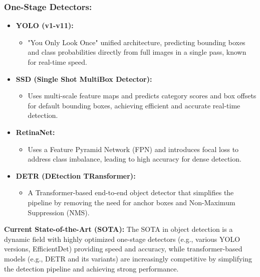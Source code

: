 \documentclass{article}
\begin{document}
\subsubsection{One-Stage Detectors:}
\begin{itemize}[leftmargin=1.5em]
  \item \textbf{YOLO (v1-v11):} 
    \begin{itemize}
      \item "You Only Look Once" unified architecture, predicting bounding boxes and class probabilities directly from full images in a single pass, known for real-time speed.
    \end{itemize}
  \item \textbf{SSD (Single Shot MultiBox Detector):}
    \begin{itemize}
      \item Uses multi-scale feature maps and predicts category scores and box offsets for default bounding boxes, achieving efficient and accurate real-time detection.
    \end{itemize}
  \item \textbf{RetinaNet:}
    \begin{itemize}
      \item Uses a Feature Pyramid Network (FPN) and introduces focal loss to address class imbalance, leading to high accuracy for dense detection.
    \end{itemize}
  \item \textbf{DETR (DEtection TRansformer):}
    \begin{itemize}
      \item A Transformer-based end-to-end object detector that simplifies the pipeline by removing the need for anchor boxes and Non-Maximum Suppression (NMS).
    \end{itemize}
\end{itemize}
\textbf{Current State-of-the-Art (SOTA):} The SOTA in object detection is a dynamic field with highly optimized one-stage detectors (e.g., various YOLO versions, EfficientDet) providing speed and accuracy, while transformer-based models (e.g., DETR and its variants) are increasingly competitive by simplifying the detection pipeline and achieving strong performance.
\end{document}
